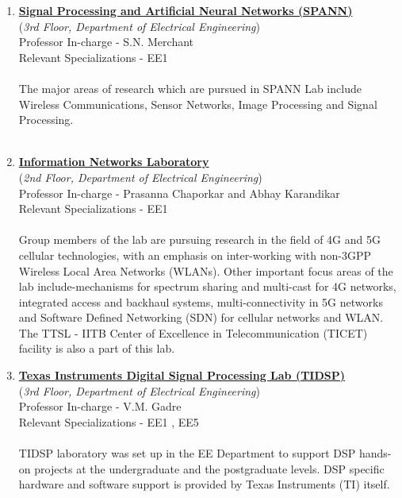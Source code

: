 \documentclass[openany]{book} %
\begin{document}
\begin{enumerate}
\item \href{https://www.ee.iitb.ac.in/~spann/} {\color{blue} \textbf{Signal Processing and Artificial Neural Networks (SPANN)}}\\
    (\textit{3rd Floor, Department of Electrical Engineering})\\
    Professor In-charge - S.N. Merchant\\
Relevant Specializations - EE1\\
\\
The major areas of research which are pursued in SPANN Lab include Wireless Communications, Sensor Networks, Image Processing and Signal Processing.\\
\\
\item \href{https://www.ee.iitb.ac.in/~infonet/} {\color{blue} \textbf{Information Networks Laboratory}}\\
    (\textit{2nd Floor, Department of Electrical Engineering})\\
    Professor In-charge - Prasanna Chaporkar and Abhay Karandikar\\
Relevant Specializations - EE1\\
\\
Group members of the lab are pursuing research in the field of 4G and 5G cellular technologies, with an emphasis on inter-working with non-3GPP Wireless Local Area Networks (WLANs). Other important focus areas of the lab include-mechanisms for spectrum sharing and multi-cast for 4G networks, integrated access and backhaul systems, multi-connectivity in 5G networks and Software Defined Networking (SDN) for cellular networks and WLAN. The TTSL - IITB Center of Excellence in Telecommunication (TICET) facility is also a part of this lab.\\

\item \href{http://www.ee.iitb.ac.in/~tidsplab/index.php} {\color{blue} \textbf{Texas Instruments Digital Signal Processing Lab (TIDSP)}}\\
    (\textit{3rd Floor, Department of Electrical Engineering})\\
    Professor In-charge - V.M. Gadre\\
Relevant Specializations - EE1 , EE5\\
\\
TIDSP laboratory was set up in the EE Department to support DSP hands-on projects at the undergraduate and the postgraduate levels. DSP specific hardware and software support is provided by Texas Instruments (TI) itself.\\


\end{enumerate}
\end{document}
